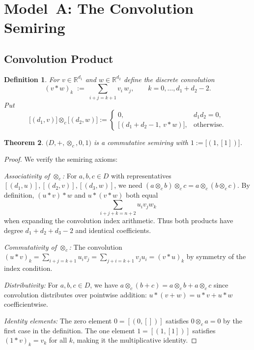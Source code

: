 \documentclass[11pt]{article}
\newtheorem{theorem}{Theorem}[section]
\newtheorem{definition}[theorem]{Definition}
\begin{document}
\section{Model A: The Convolution Semiring}
\subsection{Convolution Product}
\begin{definition}
For \(v\in\mathbb R^{d_1}\) and \(w\in\mathbb R^{d_2}\) define the discrete convolution
\[
  (v\ast w)_k \;:=\;\sum_{i+j=k+1} v_i\,w_j,\qquad k=0,\dots,d_1+d_2-2.
\]
Put
\[
  \bigl[(d_1,v)\bigr]\otimes_c\bigl[(d_2,w)\bigr]
  :=\begin{cases}
       0, & d_1d_2=0,\\[2pt]
       \bigl[(d_1+d_2-1,\,v\ast w)\bigr], & \text{otherwise.}
     \end{cases}
\]
\end{definition}

\begin{theorem}\label{thm:convSemiring}
\(\bigl(D,+,\otimes_c,0,1\bigr)\) is a commutative semiring with \(1:=\bigl[(1,[1])\bigr]\).
\end{theorem}
\begin{proof}
We verify the semiring axioms:

\textit{Associativity of $\otimes_c$:} For $a, b, c \in D$ with representatives $[(d_1,u)], [(d_2,v)], [(d_3,w)]$, we need $(a \otimes_c b) \otimes_c c = a \otimes_c (b \otimes_c c)$. By definition, $(u \ast v) \ast w$ and $u \ast (v \ast w)$ both equal
\[
\sum_{i+j+k=n+2} u_i v_j w_k
\]
when expanding the convolution index arithmetic. Thus both products have degree $d_1 + d_2 + d_3 - 2$ and identical coefficients.

\textit{Commutativity of $\otimes_c$:} The convolution $(u \ast v)_k = \sum_{i+j=k+1} u_i v_j = \sum_{j+i=k+1} v_j u_i = (v \ast u)_k$ by symmetry of the index condition.

\textit{Distributivity:} For $a, b, c \in D$, we have $a \otimes_c (b + c) = a \otimes_c b + a \otimes_c c$ since convolution distributes over pointwise addition: $u \ast (v + w) = u \ast v + u \ast w$ coefficientwise.

\textit{Identity elements:} The zero element $0 = [(0,[])]$ satisfies $0 \otimes_c a = 0$ by the first case in the definition. The one element $1 = [(1,[1])]$ satisfies $(1 \ast v)_k = v_k$ for all $k$, making it the multiplicative identity.
\qedhere
\end{proof}
\end{document}
